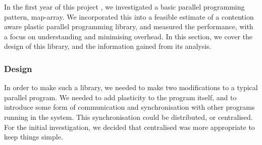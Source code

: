 In the first year of this project \cite{me}, we investigated a basic parallel programming pattern, map-array. We incorporated this into a feasible estimate of a contention aware plastic parallel programming library, and measured the performance, with a focus on understanding and minimising overhead. In this section, we cover the design of this library, and the information gained from its analysis.


\subsubsection{Design}
\label{section:background:design}

In order to make such a library, we needed to make two modifications to a typical parallel program. We needed to add plasticity to the program itself, and to introduce some form of communication and synchronisation with other programs running in the system. This synchronisation could be distributed, or centralised. For the initial investigation, we decided that centralised was more appropriate to keep things simple.

